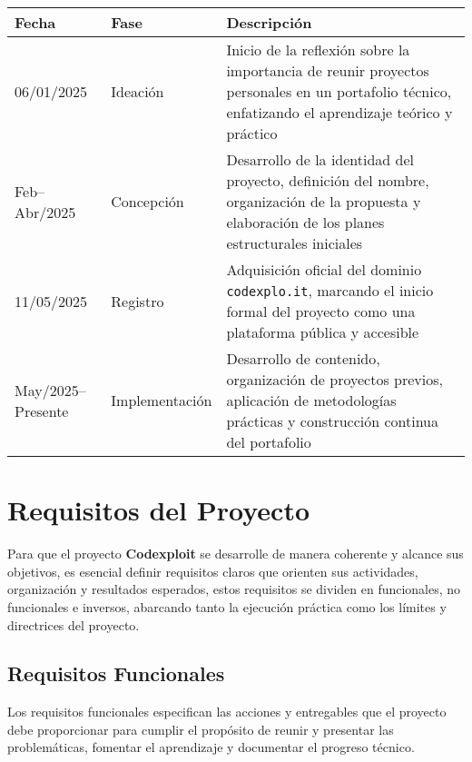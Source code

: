 \documentclass[10pt, a4paper, oneside]{article}
\begin{document}
\begin{table}[ht]
    \centering
    \setlength\tabcolsep{6pt}
    \begin{tabular}{ |l|l|p{6.8cm}| }
        \hline
        \bfseries Fecha & \bfseries Fase & \bfseries Descripción \\
        \hline
        06/01/2025 & Ideación & Inicio de la reflexión sobre la importancia de reunir proyectos personales en un portafolio técnico, enfatizando el aprendizaje teórico y práctico \\
        \hline
        Feb–Abr/2025 & Concepción & Desarrollo de la identidad del proyecto, definición del nombre, organización de la propuesta y elaboración de los planes estructurales iniciales \\
        \hline
        11/05/2025 & Registro & Adquisición oficial del dominio \texttt{codexplo.it}, marcando el inicio formal del proyecto como una plataforma pública y accesible \\
        \hline
        May/2025–Presente & Implementación & Desarrollo de contenido, organización de proyectos previos, aplicación de metodologías prácticas y construcción continua del portafolio \\
        \hline
    \end{tabular}
    \caption{\fontsize{10pt}{11pt}}
    \label{table:history}
\end{table}
\newpage

\section{Requisitos del Proyecto}

Para que el proyecto \textbf{Codexploit} se desarrolle de manera coherente y alcance sus objetivos, es esencial definir requisitos claros que orienten sus actividades, organización y resultados esperados, estos requisitos se dividen en funcionales, no funcionales e inversos, abarcando tanto la ejecución práctica como los límites y directrices del proyecto.

\subsection{Requisitos Funcionales}

Los requisitos funcionales especifican las acciones y entregables que el proyecto debe proporcionar para cumplir el propósito de reunir y presentar las problemáticas, fomentar el aprendizaje y documentar el progreso técnico.
\end{document}
